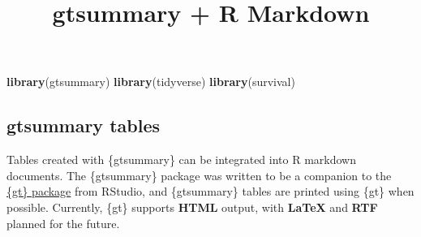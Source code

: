 \documentclass[
]{article}
\title{gtsummary + R Markdown}
\author{}
\date{\vspace{-2.5em}}
\newenvironment{Shaded}{\begin{snugshade}}{\end{snugshade}}
\newcommand{\CharTok}[1]{\textcolor[rgb]{0.31,0.60,0.02}{#1}}
\newcommand{\DataTypeTok}[1]{\textcolor[rgb]{0.13,0.29,0.53}{#1}}
\newcommand{\KeywordTok}[1]{\textcolor[rgb]{0.13,0.29,0.53}{\textbf{#1}}}
\newcommand{\NormalTok}[1]{#1}
\newcommand{\OperatorTok}[1]{\textcolor[rgb]{0.81,0.36,0.00}{\textbf{#1}}}
\newcommand{\OtherTok}[1]{\textcolor[rgb]{0.56,0.35,0.01}{#1}}
\newcommand{\StringTok}[1]{\textcolor[rgb]{0.31,0.60,0.02}{#1}}
\begin{document}
\maketitle

\begin{Shaded}
\begin{Highlighting}[]
\KeywordTok{library}\NormalTok{(gtsummary)}
\KeywordTok{library}\NormalTok{(tidyverse)}
\KeywordTok{library}\NormalTok{(survival)}
\end{Highlighting}
\end{Shaded}

\hypertarget{gtsummary-tables}{%
\subsection{gtsummary tables}\label{gtsummary-tables}}

Tables created with \{gtsummary\} can be integrated into R markdown
documents. The \{gtsummary\} package was written to be a companion to
the \href{https://gt.rstudio.com/}{\{gt\} package} from RStudio, and
\{gtsummary\} tables are printed using \{gt\} when possible. Currently,
\{gt\} supports \textbf{HTML} output, with \textbf{LaTeX} and
\textbf{RTF} planned for the future.

\begin{Shaded}
\end{Shaded}
\end{document}
